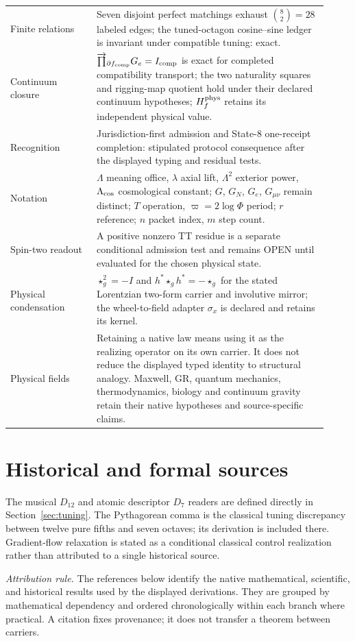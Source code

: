 \documentclass[10pt]{article}
\begin{document}
\begin{longtable}{@{}p{0.25\linewidth}p{0.67\linewidth}@{}}
Finite relations & Seven disjoint perfect matchings exhaust $\binom82=28$ labeled edges; the tuned-octagon cosine--sine ledger is invariant under compatible tuning: exact.\\
Continuum closure & $\overrightarrow{\prod}_{\partial f_{\rm comp}}G_e=I_{\rm comp}$ is exact for completed compatibility transport; the two naturality squares and rigging-map quotient hold under their declared continuum hypotheses; $H_f^{\rm phys}$ retains its independent physical value.\\
Recognition & Jurisdiction-first admission and State-8 one-receipt completion: stipulated protocol consequence after the displayed typing and residual tests.\\
Notation & $\Lambda$ meaning office, $\lambda$ axial lift, $\Lambda^2$ exterior power, $\Lambda_{\rm cos}$ cosmological constant; $G$, $G_N$, $G_e$, $G_{\mu\nu}$ remain distinct; $T$ operation, $\varpi=2\log\Phi$ period; $r$ reference; $n$ packet index, $m$ step count.\\
Spin-two readout & A positive nonzero TT residue is a separate conditional admission test and remains OPEN until evaluated for the chosen physical state.\\
Physical condensation & $\star_g^2=-I$ and $h^*\star_gh^*=-\star_g$ for the stated Lorentzian two-form carrier and involutive mirror; the wheel-to-field adapter $\sigma_x$ is declared and retains its kernel.\\
Physical fields & Retaining a native law means using it as the realizing operator on its own carrier. It does not reduce the displayed typed identity to structural analogy. Maxwell, GR, quantum mechanics, thermodynamics, biology and continuum gravity retain their native hypotheses and source-specific claims.\\
\bottomrule\end{longtable}
\normalsize
\section{Historical and formal sources}
\small
The musical $D_{12}$ and atomic descriptor $D_7$ readers are defined directly in Section~\ref{sec:tuning}. The Pythagorean comma is the classical tuning discrepancy between twelve pure fifths and seven octaves; its derivation is included there. Gradient-flow relaxation is stated as a conditional classical control realization rather than attributed to a single historical source.

\emph{Attribution rule.} The references below identify the native mathematical, scientific, and historical results used by the displayed derivations. They are grouped by mathematical dependency and ordered chronologically within each branch where practical. A citation fixes provenance; it does not transfer a theorem between carriers.
\end{document}
